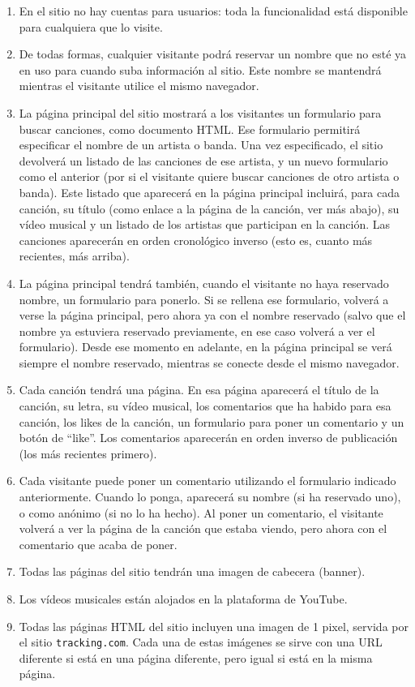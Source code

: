 \begin{enumerate}
\item En el sitio no hay cuentas para usuarios: toda la funcionalidad está disponible para cualquiera que lo visite.
\item De todas formas, cualquier visitante podrá reservar un nombre que no esté ya en uso para cuando suba información al sitio. Este nombre se mantendrá mientras el visitante utilice el mismo navegador.
\item La página principal del sitio mostrará a los visitantes un formulario para buscar canciones, como documento HTML. Ese formulario permitirá especificar el nombre de un artista o banda. Una vez especificado, el sitio devolverá un listado de las canciones de ese artista, y un nuevo formulario como el anterior (por si el visitante quiere buscar canciones de otro artista o banda). Este listado que aparecerá en la página principal incluirá, para cada canción, su título (como enlace a la página de la canción, ver más abajo), su vídeo musical y un listado de los artistas que participan en la canción. Las canciones aparecerán en orden cronológico inverso (esto es, cuanto más recientes, más arriba).
\item La página principal tendrá también, cuando el visitante no haya reservado nombre, un formulario para ponerlo. Si se rellena ese formulario, volverá a verse la página principal, pero ahora ya con el nombre reservado (salvo que el nombre ya estuviera reservado previamente, en ese caso volverá a ver el formulario). Desde ese momento en adelante, en la página principal se verá siempre el nombre reservado, mientras se conecte desde el mismo navegador.
\item Cada canción tendrá una página. En esa página aparecerá el título de la canción, su letra, su vídeo musical, los comentarios que ha habido para esa canción, los likes de la canción, un formulario para poner un comentario y un botón de ``like''. Los comentarios aparecerán en orden inverso de publicación (los más recientes primero).
\item Cada visitante puede poner un comentario utilizando el formulario indicado anteriormente. Cuando lo ponga, aparecerá su nombre (si ha reservado uno), o como anónimo (si no lo ha hecho). Al poner un comentario, el visitante volverá a ver la página de la canción que estaba viendo, pero ahora con el comentario que acaba de poner.
\item Todas las páginas del sitio tendrán una imagen de cabecera (banner).
\item Los vídeos musicales están alojados en la plataforma de YouTube.
\item Todas las páginas HTML del sitio incluyen una imagen de 1 pixel, servida por el sitio \texttt{tracking.com}. Cada una de estas imágenes se sirve con una URL diferente si está en una página diferente, pero igual si está en la misma página.

\end{enumerate}

